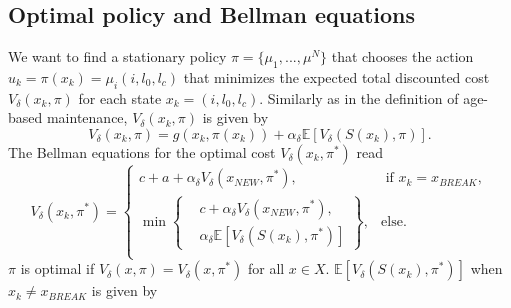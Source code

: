 \subsection{Optimal policy and Bellman equations}
We want to find a stationary policy $\pi= \{\mu_1,...,\mu^N\}$ that chooses the action $u_k=\pi(x_k)=\mu_i(i,l_0,l_c)$ that minimizes the expected total discounted cost $V_\delta(x_k,\pi)$ for each state $x_k=(i,l_0,l_c)$.
Similarly as in the definition of age-based maintenance, $V_\delta(x_k,\pi)$ is given by
\[V_\delta(x_k,\pi)=g(x_k,\pi(x_k))+\alpha_\delta \mathbb{E}[V_\delta(S(x_k),\pi)].\]
The Bellman equations for the optimal cost $V_\delta(x_k,\pi^*)$ read
\begin{equation}\label{eq:MmfmBellman}
V_\delta(x_k,\pi^*)=\begin{cases}
c+a+\alpha_\delta V_\delta(x_{NEW},\pi^*),&\text{ if }x_k=x_{BREAK},\\
\min\left\{\begin{split}&c+\alpha_\delta V_\delta(x_{NEW},\pi^*),\\&\alpha_\delta \mathbb{E}[V_\delta(S(x_k),\pi^*)]\end{split}\right\},&\text{else.}\\
\end{cases}
\end{equation}
$\pi$ is optimal if $V_\delta(x,\pi)=V_\delta(x,\pi^*)$ for all $x\in X$.
$\mathbb{E}[V_\delta(S(x_k),\pi^*)]$ when $x_k\neq x_{BREAK}$ is given by 
